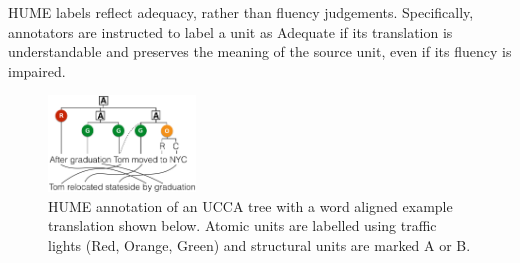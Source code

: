 \documentclass[11pt,letterpaper]{article}
\newcommand{\com}[1]{}
\newcommand{\figref}[1]{Figure~\ref{#1}}
\begin{document}
HUME labels reflect adequacy, rather than fluency judgements.
Specifically, annotators are instructed to
label a unit as Adequate if its translation is understandable and preserves
the meaning of the source unit, even if its fluency is impaired.

\com{
In non-configurational languages, the relationship between the
governing and dependent units is often expressed using morphological
properties of the dependants instead of their ordering
(this holds especially for the verb and its modifiers,
less so for components of noun phrases). Errors in morphology
should be expressed on the atomic units, so HUME can behave differently
on configurational vs. non-configurational languages.
}




\begin{figure}
    \begin{center}
    \includegraphics[width=0.35\textwidth]{ucca-tree-mteval-v2.png}
    \end{center}
  \caption{\label{fig:hume_tree_v2}
     HUME annotation of an UCCA tree with a word aligned example translation shown below. 
Atomic units are labelled using traffic lights (Red, Orange, Green) and structural units are marked A or B.}
\end{figure}
\end{document}
